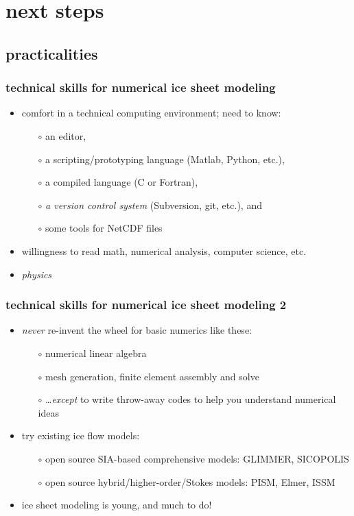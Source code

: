 
\section{next steps}

\subsection{practicalities}

\begin{frame}[fragile]
\frametitle{technical skills for numerical ice sheet modeling}

\begin{itemize}
\item comfort in a technical computing environment; need to know:
  \begin{itemize}\small
  \item[$\circ$] an editor,
  \item[$\circ$] a scripting/prototyping language (Matlab, Python, etc.),
  \item[$\circ$] a compiled language (C or Fortran),
  \item[$\circ$] \emph{a version control system} (Subversion, git, etc.), and
  \item[$\circ$] some tools for NetCDF files
  \normalsize
  \end{itemize}
\item willingness to read math, numerical analysis, computer science, etc.
\item \emph{physics}
\end{itemize}
\end{frame}


\begin{frame}
\frametitle{technical skills for numerical ice sheet modeling 2}

\begin{itemize}
\item \emph{never} re-invent the wheel for basic numerics like these:
  \begin{itemize}
  \item[$\circ$] numerical linear algebra
  \item[$\circ$] mesh generation, finite element assembly and solve
  \item[$\circ$] \dots \emph{except} to write throw-away codes to help you understand numerical ideas 
  \end{itemize}
\item try existing ice flow models:
  \begin{itemize}
  \item[$\circ$] open source SIA-based comprehensive models: GLIMMER, SICOPOLIS
  \item[$\circ$] open source hybrid/higher-order/Stokes models: PISM, Elmer, ISSM
  \end{itemize}
\item ice sheet modeling is young, and much to do!
\end{itemize}
\end{frame}


